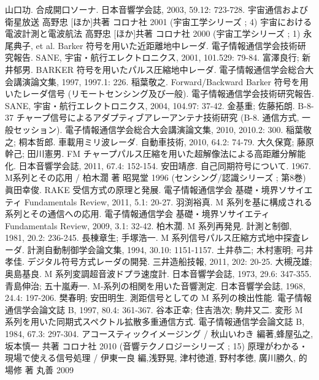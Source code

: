\begin{thebibliography}{99}
 山口功. 合成開口ソーナ. 日本音響学会誌, 2003, 59.12: 723-728.
 宇宙通信および衛星放送 高野忠 [ほか]共著 コロナ社 2001 (宇宙工学シリーズ ; 4)
 宇宙における電波計測と電波航法 高野忠 [ほか]共著 コロナ社 2000 (宇宙工学シリーズ ; 1)
 永尾典子, et al. Barker 符号を用いた近距離地中レーダ. 電子情報通信学会技術研究報告. SANE, 宇宙・航行エレクトロニクス, 2001, 101.529: 79-84.
 富澤良行; 新井郁男. BARKER 符号を用いたパルス圧縮地中レーダ. 電子情報通信学会総合大会講演論文集, 1997, 1997.1: 226.
 稲葉敬之. Forward/Backward Barker 符号を用いたレーダ信号 (リモートセンシング及び一般). 電子情報通信学会技術研究報告. SANE, 宇宙・航行エレクトロニクス, 2004, 104.97: 37-42.
 金基重; 佐藤拓朗. B-8-37 チャープ信号によるアダプティブアレーアンテナ技術研究 (B-8. 通信方式, 一般セッション). 電子情報通信学会総合大会講演論文集, 2010, 2010.2: 300.
 稲葉敬之; 桐本哲郎. 車載用ミリ波レーダ. 自動車技術, 2010, 64.2: 74-79.
 大久保寛; 藤原幹己; 田川憲男. FM チャープパルス圧縮を用いた超解像法による高距離分解能化. 日本音響学会誌, 2011, 67.4: 152-154.
 安田靖彦. 自己同期符号について. 1967.
 M系列とその応用 / 柏木濶 著 昭晃堂 1996 (センシング/認識シリーズ ; 第8巻)
 眞田幸俊. RAKE 受信方式の原理と発展. 電子情報通信学会 基礎・境界ソサイエティ Fundamentals Review, 2011, 5.1: 20-27.
 羽渕裕真. M 系列を基に構成される系列とその通信への応用. 電子情報通信学会 基礎・境界ソサイエティ Fundamentals Review, 2009, 3.1: 32-42.
 柏木濶. M 系列再発見. 計測と制御, 1981, 20.2: 236-245.
 長棟章生; 手塚浩一. M 系列信号パルス圧縮方式地中探査レーダ. 計測自動制御学会論文集, 1994, 30.10: 1151-1157.
 土井恭二; 木村憲明; 弓井孝佳. デジタル符号方式レーダの開発. 三井造船技報, 2011, 202: 20-25.
 大槻茂雄; 奥島基良. M 系列変調超音波ドプラ速度計. 日本音響学会誌, 1973, 29.6: 347-355.
 青島伸治; 五十嵐寿一. M-系列の相関を用いた音響測定. 日本音響学会誌, 1968, 24.4: 197-206.
 樊春明; 安田明生. 測距信号としての M 系列の検出性能. 電子情報通信学会論文誌 B, 1997, 80.4: 361-367.
 谷本正幸; 住吉浩次; 駒井又二. 変形 M 系列を用いた同期式スペクトル拡散多重通信方式. 電子情報通信学会論文誌 B, 1984, 67.3: 297-304.
 アコースティックイメージング / 秋山いわき 編著,蜂屋弘之, 坂本慎一 共著 コロナ社 2010 (音響テクノロジーシリーズ ; 15)
 原理がわかる・現場で使える信号処理 / 伊東一良 編,浅野晃, 津村徳道, 野村孝徳, 廣川勝久, 的場修 著 丸善 2009

\end{thebibliography}
